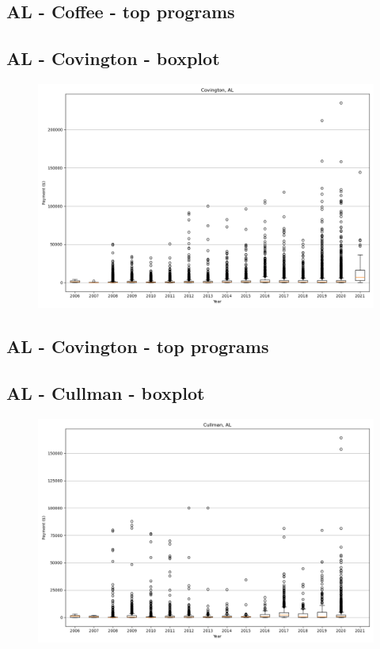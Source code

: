 \subsection*{AL - Coffee - top programs}

\newpage
\subsection*{AL - Covington - boxplot}
\begin{figure}[h]
\centering
\includegraphics[width=7in]{../output/boxplots/counties/Covington-AL_boxplot.png}
\end{figure}


\subsection*{AL - Covington - top programs}

\newpage
\subsection*{AL - Cullman - boxplot}
\begin{figure}[h]
\centering
\includegraphics[width=7in]{../output/boxplots/counties/Cullman-AL_boxplot.png}
\end{figure}


